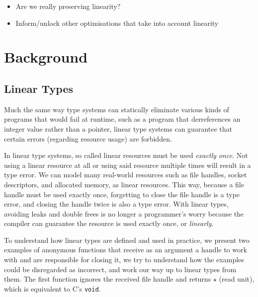 \documentclass[]{lwnovathesis}
\begin{document}
\begin{itemize}
    \item Are we really preserving linearity?
    \item Inform/unlock other optimisations that take into account linearity
\end{itemize}


\chapter{Background}

\section{Linear Types\label{linear-types}}

Much the same way type systems can statically eliminate various kinds of
programs that would fail at runtime, such as a program that derreferences an
integer value rather than a pointer, linear type systems can guarantee that
certain errors (regarding resource usage) are forbidden.

In linear type systems, so called linear resources must be used \emph{exactly
once}. Not using a linear resource at all or using said resource multiple times
will result in a type error. We can model many real-world resources such as file
handles, socket descriptors, and allocated memory, as linear resources. This
way, because a file handle must be used exactly once, forgetting to close the
file handle is a type error, and closing the handle twice is also a type error.
With linear types, avoiding leaks and double frees is no longer a programmer's
worry because the compiler can guarantee the resource is used exactly once, or
\emph{linearly}.

To understand how linear types are defined and used in practice, we present two
examples of anonymous functions that receive as an argument a handle to work
with and are responsible for closing it, we try to understand how the examples
could be disregarded as incorrect, and work our way up to linear types from
them. The first function ignores the received file handle and returns $\star$
(read unit), which is equivalent to C's \texttt{void}.
\end{document}
